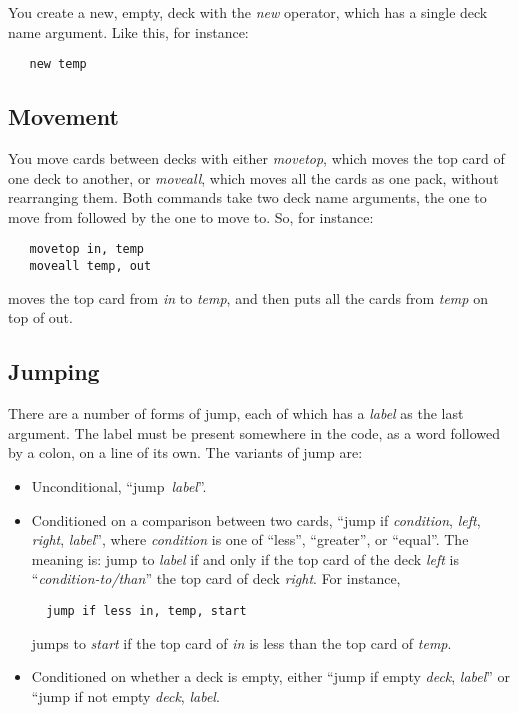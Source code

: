 \documentclass[a4paper,twoside]{tufte-handout}
\begin{document}
You create a new, empty, deck with the \emph{new} operator, which has
a single deck name argument. Like this, for instance:
\begin{lstlisting}
   new temp
\end{lstlisting}

\subsection{Movement}\label{sec-move}

You move cards between decks with either \emph{movetop}, which moves
the top card of one deck to another, or \emph{moveall}, which moves
all the cards as one pack, without rearranging them. Both
commands take two deck name arguments, the one to move from followed
by the one to move to. So, for instance:
\begin{lstlisting}
   movetop in, temp
   moveall temp, out
\end{lstlisting}
moves the top card from \emph{in} to \emph{temp}, and then puts all
the cards from \emph{temp} on top of out.

\subsection{Jumping}\label{sec-}

There are a number of forms of jump, each of which has a \emph{label}
as the last argument. The label must be present somewhere in the code,
as a word followed by a colon, on a line of its own. The variants of
jump are:
\begin{itemize}
\item Unconditional, ``jump~\emph{label}''.
\item Conditioned on a comparison between two cards,
``jump if \emph{condition}, \emph{left}, \emph{right}, \emph{label}'',
where \emph{condition} is one of ``less'', ``greater'', or
``equal''. The meaning is: jump to \emph{label} if and only if the top
card of the deck \emph{left} is ``\emph{condition-to/than}'' the top card
of deck \emph{right}. For instance,
\begin{lstlisting}
  jump if less in, temp, start
\end{lstlisting}
jumps to \emph{start} if the top card of \emph{in} is less than the top card
of \emph{temp}.

\item Conditioned on whether a deck is empty, either ``jump if
  empty \emph{deck}, \emph{label}'' or ``jump if not empty \emph{deck},
  \emph{label}.
\end{itemize}
\end{document}
